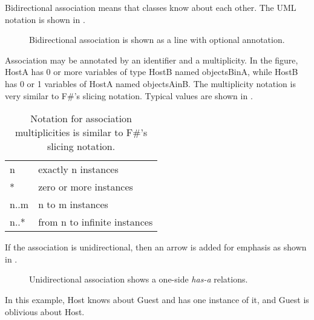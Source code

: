 Bidirectional association means that classes know about each other. The UML notation is shown in .
\begin{figure}
  \centering
  \caption{Bidirectional association is shown as a line with optional annotation.}
  \label{fig:association}
\end{figure}
Association may be annotated by an identifier and a multiplicity. In the figure, HostA has 0 or more variables of type HostB named objectsBinA, while HostB has 0 or 1 variables of HostA named objectsAinB. The multiplicity notation is very similar to F\#'s slicing notation. Typical values are shown in .
\begin{table}
  \centering
  \begin{tabular}{|l|l|}
    \hline
    n & exactly n instances\\
    * & zero or more instances \\
    n..m & n to m instances\\
    n..* & from n to infinite instances\\
    \hline
  \end{tabular}
  \caption{Notation for association multiplicities is similar to F\#'s slicing notation.}
  \label{tab:multiplicity}
\end{table}
If the association is unidirectional, then an arrow is added for emphasis as shown in .
\begin{figure}
  \centering
  \caption{Unidirectional association shows a one-side \emph{has-a} relations.}
  \label{fig:unidirectionalAssociation}
\end{figure}
In this example, Host knows about Guest and has one instance of it, and Guest is oblivious about Host.


